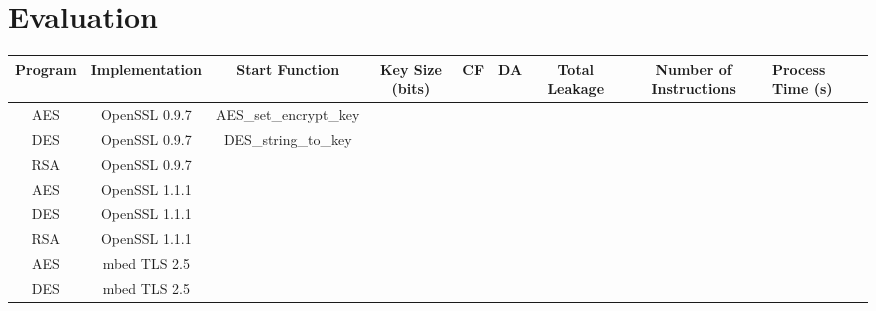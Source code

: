 \section{Evaluation}

\begin{table*}[t]
    \begin{tabular}{c c c c c c c c l}
    \hline
    Program                   & Implementation                     & Start Function         & Key Size (bits)     & CF                    & DA                    & Total Leakage     & Number of Instructions & Process Time (s) \\ \hline
    AES                       & OpenSSL 0.9.7                      & AES\_set\_encrypt\_key &                       &                       &                       &                       &                        &                  \\
    DES                       & OpenSSL 0.9.7                      & DES\_string\_to\_key   &                       &                       &                       &                       &                        &                  \\
    RSA                       & OpenSSL 0.9.7                      &                        &                       &                       &                       &                       &                        &                  \\
    AES                       & OpenSSL 1.1.1                      &                        &                       &                       &                       &                       &                        &                  \\
    DES                       & OpenSSL 1.1.1                      &                        &                       &                       &                       &                       &                        &                  \\
    RSA                       & OpenSSL 1.1.1                      &                        &                       &                       &                       &                       &                        &                  \\
    AES                       & mbed TLS 2.5                       &                        &                       &                       &                       &                       &                        &                  \\
    DES                       & mbed TLS 2.5                       &                        &                       &                       &                       &                       &                        &                  \\

\end{tabular}
\end{table*}
